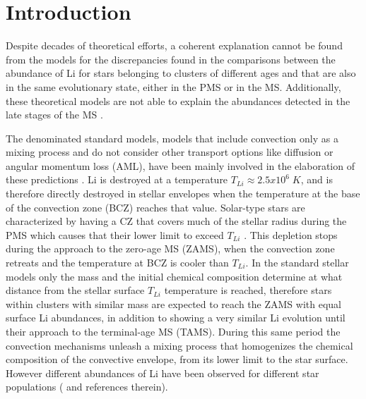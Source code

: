 \documentclass[fleqn,usenatbib]{mnras}
\begin{document}
\section{Introduction}
Despite decades of theoretical efforts, a coherent explanation cannot be found from the models for the discrepancies found in the comparisons between the abundance of Li for stars belonging to clusters of different ages and that are also in the same evolutionary state, either in the PMS or in the MS. Additionally, these theoretical models are not able to explain the abundances detected in the late stages of the MS \citep{Tschape2001}.\par

The denominated standard models, models that include convection only as a mixing process and do not consider other transport options like diffusion or angular momentum loss (AML), have been mainly involved in the elaboration of these predictions \citep{Sestito2005}. Li is destroyed at a temperature $T_{Li} \approx 2.5 x 10^6\; K$, and is therefore directly destroyed in stellar envelopes when the temperature at the base of the convection zone (BCZ) reaches that value. Solar-type stars are characterized by having a CZ that covers much of the stellar radius during the PMS which causes that their lower limit to exceed $T_{Li}$ \citep{Iben1965}. This depletion stops during the approach to the zero-age MS (ZAMS), when the convection zone retreats and the temperature at BCZ is cooler than $T_{Li}$. In the standard stellar models only the mass and the initial chemical composition determine at what distance from the stellar surface $T_{Li}$ temperature is reached, therefore stars within clusters with similar mass are expected to reach the ZAMS with equal surface Li abundances, in addition to showing a very similar Li evolution until their approach to the terminal-age MS (TAMS). During this same period the convection mechanisms unleash a mixing process that homogenizes the chemical composition of the convective envelope, from its lower limit to the star surface. However different abundances of Li have been observed for different star populations (\citet{Somers2014} and references therein).\par
\end{document}
